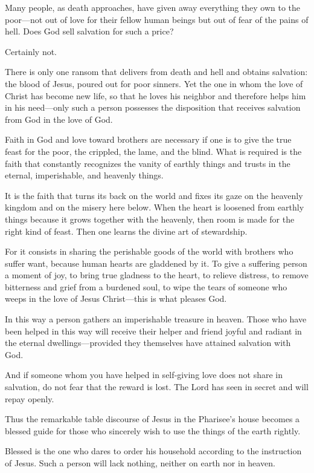 Many people, as death approaches, have given away everything they own to the poor—not out of love for their fellow human beings but out of fear of the pains of hell. Does God sell salvation for such a price? 

Certainly not.

There is only one ransom that delivers from death and hell and obtains salvation: the blood of Jesus, poured out for poor sinners. Yet the one in whom the love of Christ has become new life, so that he loves his neighbor and therefore helps him in his need—only such a person possesses the disposition that receives salvation from God in the love of God.

Faith in God and love toward brothers are necessary if one is to give the true feast for the poor, the crippled, the lame, and the blind. What is required is the faith that constantly recognizes the vanity of earthly things and trusts in the eternal, imperishable, and heavenly things.

It is the faith that turns its back on the world and fixes its gaze on the heavenly kingdom and on the misery here below. When the heart is loosened from earthly things because it grows together with the heavenly, then room is made for the right kind of feast. Then one learns the divine art of stewardship.

For it consists in sharing the perishable goods of the world with brothers who suffer want, because human hearts are gladdened by it. To give a suffering person a moment of joy, to bring true gladness to the heart, to relieve distress, to remove bitterness and grief from a burdened soul, to wipe the tears of someone who weeps in the love of Jesus Christ—this is what pleases God.

In this way a person gathers an imperishable treasure in heaven. Those who have been helped in this way will receive their helper and friend joyful and radiant in the eternal dwellings—provided they themselves have attained salvation with God.

And if someone whom you have helped in self‑giving love does not share in salvation, do not fear that the reward is lost. The Lord has seen in secret and will repay openly.

Thus the remarkable table discourse of Jesus in the Pharisee’s house becomes a blessed guide for those who sincerely wish to use the things of the earth rightly.

Blessed is the one who dares to order his household according to the instruction of Jesus. Such a person will lack nothing, neither on earth nor in heaven.

